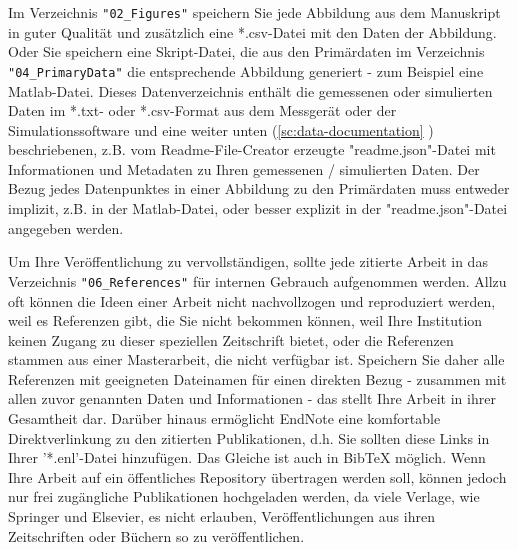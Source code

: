 \begin{table}[H]
 
  \caption{%
  Die Daten jeder Arbeit müssen in acht Unterverzeichnissen gespeichert werden;
  weitere Hinweise: \\
  **Wenn die Arbeit druckreif ist, lädt die korrespondierende Person (Autorin/Autor) die letzte und überarbeitete Version (d.h. die mit den tatsächlich verwendeten Daten) in das geschützte Verzeichnis \\
  ***Wenn die in einer Abbildung/Tabelle wiedergegebenen Daten aus verteilten   Primärdatenverzeichnissen stammen, genügt es, hier nur das erzeugende Programm zu speichern%
  }
\label{table:paper-directory-structure}
\end{table}

Im Verzeichnis \texttt{"02\_Figures"} speichern Sie jede Abbildung aus dem Manuskript in guter Qualität und zusätzlich eine *.csv-Datei mit den Daten der Abbildung. Oder Sie speichern eine Skript-Datei, die aus den Primärdaten im Verzeichnis \texttt{"04\_PrimaryData"} die entsprechende Abbildung generiert - zum Beispiel eine Matlab-Datei. Dieses Datenverzeichnis enthält die gemessenen oder simulierten Daten im *.txt- oder *.csv-Format aus dem Messgerät oder der Simulationssoftware und eine weiter unten (\ref{sc:data-documentation}  ) beschriebenen, z.B. vom Readme-File-Creator erzeugte "readme.json"-Datei mit Informationen und Metadaten zu Ihren gemessenen / simulierten Daten. Der Bezug jedes Datenpunktes in einer Abbildung zu den Primärdaten muss entweder implizit, z.B. in der Matlab-Datei, oder besser explizit in der "readme.json"-Datei angegeben werden.

Um Ihre Veröffentlichung zu vervollständigen, sollte jede zitierte Arbeit in das Verzeichnis \texttt{"06\_References"} für internen Gebrauch aufgenommen werden. Allzu oft können die Ideen einer Arbeit nicht nachvollzogen und reproduziert werden, weil es Referenzen gibt, die Sie nicht bekommen können, weil Ihre
Institution keinen Zugang zu dieser speziellen Zeitschrift bietet, oder die Referenzen stammen aus einer Masterarbeit, die nicht verfügbar ist. Speichern Sie daher alle Referenzen mit geeigneten Dateinamen für einen direkten Bezug - zusammen mit allen zuvor genannten Daten und Informationen - das stellt Ihre Arbeit in ihrer Gesamtheit dar. Darüber hinaus ermöglicht EndNote eine komfortable Direktverlinkung zu den zitierten Publikationen, d.h. Sie sollten diese Links in Ihrer '*.enl'-Datei hinzufügen. Das Gleiche ist auch in BibTeX
möglich. Wenn Ihre Arbeit auf ein öffentliches Repository übertragen werden soll, können jedoch nur frei zugängliche Publikationen hochgeladen werden, da viele Verlage, wie Springer und Elsevier, es nicht erlauben, Veröffentlichungen aus ihren Zeitschriften oder Büchern so zu veröffentlichen.

